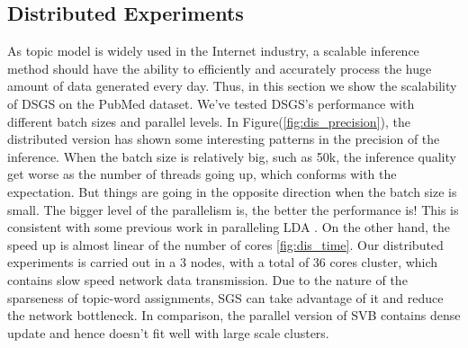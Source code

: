 \documentclass{article} %
\begin{document}
\subsection{Distributed Experiments}
As topic model is widely used in the Internet industry, a scalable inference method should have the ability to efficiently and accurately process the huge amount of data generated every day. Thus, in this section we show the scalability of DSGS on the PubMed dataset. We've tested DSGS's performance with different batch sizes and parallel levels. In Figure(\ref{fig:dis_precision}), the distributed version has shown some interesting patterns in the precision of the inference. When the batch size is relatively big, such as 50k, the inference quality get worse as the number of threads going up, which conforms with the expectation. But things are going in the opposite direction when the batch size is small. The bigger level of the parallelism is, the better the performance is! This is consistent with some previous work in paralleling LDA \cite{broderick2013streaming}. On the other hand, the speed up is almost linear of the number of cores \ref{fig:dis_time}. Our distributed experiments is carried out in a 3 nodes, with a total of 36 cores cluster, which contains slow speed network data transmission. Due to the nature of the sparseness of topic-word assignments, SGS can take advantage of it and reduce the network bottleneck. In comparison, the parallel version of SVB contains dense update and hence doesn't fit well with large scale clusters.

\end{document}

